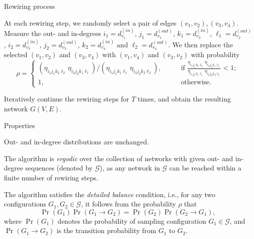 \documentclass[xcolor=dvipsnames, compress, 10pt]{beamer}
\theoremstyle{remark}
\newcommand{\dout}{d^{(in)}}
\newcommand{\din}{d^{(out)}}
\begin{document}
\begin{frame}{Rewiring process}
	
At each 
rewiring step, we randomly select a pair of edges
$(v_1, v_2), (v_3, v_4)$. Measure the out- and in-degrees 
$i_1 = \dout_{v_1}$, $j_1 = \din_{v_1}$, 
$k_1 = \dout_{v_2}$, $\ell_1 = \din_{v_2}$, 
$i_2 = \dout_{v_3}$, $j_2 = \din_{v_3}$, 
$k_2 = \dout_{v_4}$ and $\ell_2 = \din_{v_4}$.
We then replace the selected $(v_1, v_2)$ and $(v_3, v_4)$ with
$(v_1, v_4)$ and $(v_3, v_2)$ with probability
\begin{equation*}
   \rho = \begin{cases}
   	\left(\eta_{i_1 j_1 k_2 \ell_2}\, \eta_{i_2 j_2 k_1 \ell_1}\right)/
    \left(\eta_{i_1 j_1 k_1 \ell_1}\, \eta_{i_2 j_2 k_2 \ell_2}\right), 
    &\qquad \text{if }
    \frac{\eta_{i_1 j_1 k_2 \ell_2}\, \eta_{i_2 j_2 k_1 \ell_1}}
	{\eta_{i_1 j_1 k_1 \ell_1}\, \eta_{i_2 j_2 k_2 \ell_2}} < 1;
    \\ 1, &\qquad \text{otherwise}.
    \end{cases}
\end{equation*} 

\vspace{0.2cm}

Iteratively continue the rewiring steps for $T$ times, and obtain the resulting
network $G(V, E)$.

\end{frame}



\begin{frame}{Properties}

Out- and in-degree distributions are unchanged.

\vspace{0.2cm}

The algorithm is \emph{ergodic} over the 
collection of networks with given out- and in-degree sequences 
(denoted by $\mathcal{G}$), as any network in $\mathcal{G}$ can be 
reached within a finite number of rewiring steps. 

\vspace{0.2cm}

The algorithm satisfies the \emph{detailed balance} condition, 
i.e., for any 
two configurations $G_1, G_2 
\in \mathcal{G}$, it follows from the probability $\rho$ that 
\[
\Pr(G_1) \Pr(G_1 \to G_2) = \Pr(G_2) \Pr(G_2 \to G_1),
\]
where $\Pr(G_1)$ denotes the probability of sampling configuration 
$G_1 \in \mathcal{G}$, and $\Pr(G_1 \to G_2)$ is the transition 
probability from $G_1$ to $G_2$. 

\end{frame}
\end{document}
